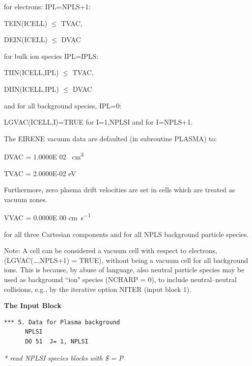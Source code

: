 for electrons: IPL=NPLS+1:

TEIN(ICELL) $\le$ TVAC,

DEIN(ICELL) $\le$ DVAC

for bulk ion species IPL=IPLS:

TIIN(ICELL,IPL) $\le$ TVAC,

DIIN(ICELL,IPL) $\le$ DVAC

and for all background species, IPL=0:

LGVAC(ICELL,I)=TRUE for I=1,NPLSI and for I=NPLS+1.

The EIRENE vacuum data are defaulted (in subroutine PLASMA) to:

DVAC = 1.0000E 02 \si{\per\cubic\centi\metre}

TVAC = 2.0000E-02 \si{\electronvolt}

Furthermore, zero plasma drift velocities are set in cells which are treated as
vacuum zones.

VVAC = 0.0000E 00  \si{\centi\metre\per\second}

for all three Cartesian components and for all NPLS background particle
species.

Note: A cell can be considered a vacuum cell with respect to electrons,
(LGVAC(\dots,NPLS+1) = TRUE), without being a vacuum cell for all background
ions.
This is because, by abuse of language, also neutral particle species may be
used as background ``ion" species (NCHARP = 0), to include neutral--neutral
collisions, e.g., by the iterative option NITER (input block 1).

\medskip

\textbf{The Input Block}

\begin{lstlisting}
*** 5. Data for Plasma background
      NPLSI
      DO 51  J= 1, NPLSI
\end{lstlisting}

\textsl{* read NPLSI species blocks with \$ = P}

